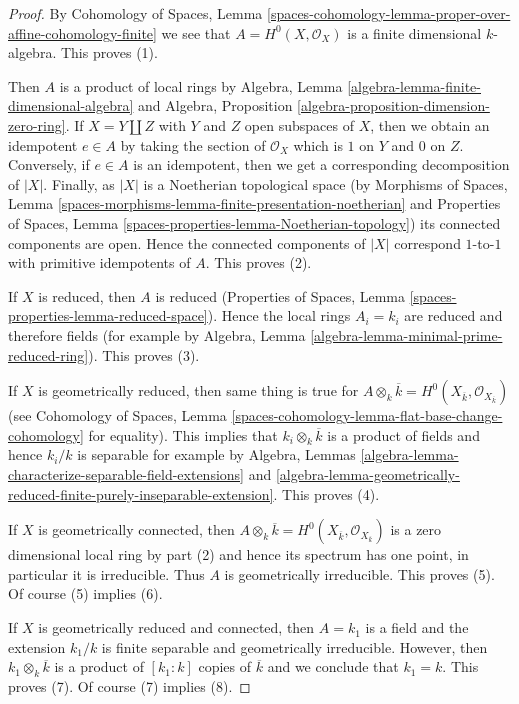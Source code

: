 \documentclass{stacks-project}
\theoremstyle{plain}
\theoremstyle{definition}
\theoremstyle{remark}
\numberwithin{equation}{subsection}
\begin{document}
\begin{proof}
By Cohomology of Spaces, Lemma
\ref{spaces-cohomology-lemma-proper-over-affine-cohomology-finite}
we see that $A = H^0(X, \mathcal{O}_X)$ is a finite dimensional
$k$-algebra. This proves (1).

\medskip\noindent
Then $A$ is a product of local rings by
Algebra, Lemma \ref{algebra-lemma-finite-dimensional-algebra} and
Algebra, Proposition \ref{algebra-proposition-dimension-zero-ring}.
If $X = Y \amalg Z$ with $Y$ and $Z$ open subspaces of $X$, then we obtain
an idempotent $e \in A$ by taking the section of $\mathcal{O}_X$
which is $1$ on $Y$ and $0$ on $Z$. Conversely, if $e \in A$
is an idempotent, then we get a corresponding decomposition of $|X|$.
Finally, as $|X|$ is a Noetherian topological space
(by Morphisms of Spaces, Lemma
\ref{spaces-morphisms-lemma-finite-presentation-noetherian} and
Properties of Spaces, Lemma
\ref{spaces-properties-lemma-Noetherian-topology})
its connected components are open. Hence the connected components
of $|X|$ correspond $1$-to-$1$ with primitive idempotents of $A$.
This proves (2).

\medskip\noindent
If $X$ is reduced, then $A$ is reduced
(Properties of Spaces, Lemma \ref{spaces-properties-lemma-reduced-space}).
Hence the local rings $A_i = k_i$ are reduced and therefore fields
(for example by Algebra, Lemma \ref{algebra-lemma-minimal-prime-reduced-ring}).
This proves (3).

\medskip\noindent
If $X$ is geometrically reduced, then same thing is true for
$A \otimes_k \overline{k} =
H^0(X_{\overline{k}}, \mathcal{O}_{X_{\overline{k}}})$
(see Cohomology of Spaces, Lemma
\ref{spaces-cohomology-lemma-flat-base-change-cohomology} for equality).
This implies that $k_i \otimes_k \overline{k}$ is a product
of fields and hence $k_i/k$ is separable for example by
Algebra,
Lemmas \ref{algebra-lemma-characterize-separable-field-extensions} and
\ref{algebra-lemma-geometrically-reduced-finite-purely-inseparable-extension}.
This proves (4).

\medskip\noindent
If $X$ is geometrically connected, then $A \otimes_k \overline{k} =
H^0(X_{\overline{k}}, \mathcal{O}_{X_{\overline{k}}})$
is a zero dimensional local ring by part (2) and hence its
spectrum has one point, in particular it is irreducible.
Thus $A$ is geometrically irreducible. This proves (5).
Of course (5) implies (6).

\medskip\noindent
If $X$ is geometrically reduced and connected, then
$A = k_1$ is a field and the extension $k_1/k$ is finite separable and
geometrically irreducible. However, then $k_1 \otimes_k \overline{k}$
is a product of $[k_1 : k]$ copies of $\overline{k}$ and we conclude
that $k_1 = k$. This proves (7). Of course (7) implies (8).
\end{proof}
\end{document}
